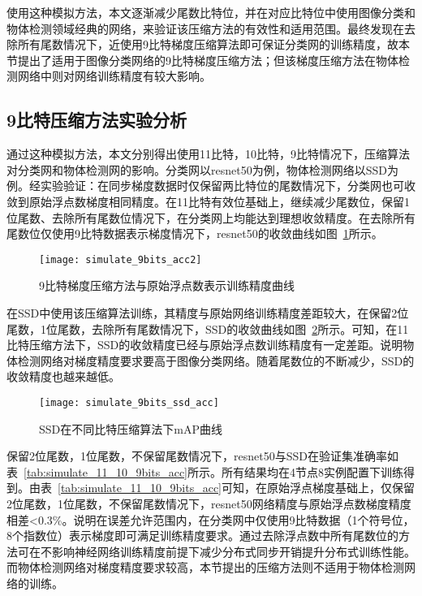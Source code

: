 使用这种模拟方法，本文逐渐减少尾数比特位，并在对应比特位中使用图像分类和物体检测领域经典的网络，来验证该压缩方法的有效性和适用范围。最终发现在去除所有尾数情况下，近使用9比特梯度压缩算法即可保证分类网的训练精度，故本节提出了适用于图像分类网络的9比特梯度压缩方法；但该梯度压缩方法在物体检测网络中则对网络训练精度有较大影响。

\subsection{9比特压缩方法实验分析}
通过这种模拟方法，本文分别得出使用11比特，10比特，9比特情况下，压缩算法对分类网和物体检测网的影响。分类网以resnet50为例，物体检测网络以SSD为例。经实验验证：在同步梯度数据时仅保留两比特位的尾数情况下，分类网也可收敛到原始浮点数梯度相同精度。在11比特有效位基础上，继续减少尾数位，保留1位尾数、去除所有尾数位情况下，在分类网上均能达到理想收敛精度。在去除所有尾数位仅使用9比特数据表示梯度情况下，resnet50的收敛曲线如图~\ref{fig:simulate_9bits_acc}所示。

\begin{figure}[htp]
\centering
\texttt{[image: simulate\_9bits\_acc2]}
\caption{9比特梯度压缩方法与原始浮点数表示训练精度曲线}
\label{fig:simulate_9bits_acc}
\end{figure}

在SSD中使用该压缩算法训练，其精度与原始网络训练精度差距较大，在保留2位尾数，1位尾数，去除所有尾数情况下，SSD的收敛曲线如图~\ref{fig:simulate_9bits_ssd_acc}所示。可知，在11比特压缩方法下，SSD的收敛精度已经与原始浮点数训练精度有一定差距。说明物体检测网络对梯度精度要求要高于图像分类网络。随着尾数位的不断减少，SSD的收敛精度也越来越低。
\begin{figure}[htp]
\centering
\texttt{[image: simulate\_9bits\_ssd\_acc]}
\caption{SSD在不同比特压缩算法下mAP曲线}
\label{fig:simulate_9bits_ssd_acc}
\end{figure}

保留2位尾数，1位尾数，不保留尾数情况下，resnet50与SSD在验证集准确率如表~\ref{tab:simulate_11_10_9bits_acc}所示。所有结果均在4节点8实例配置下训练得到。由表~\ref{tab:simulate_11_10_9bits_acc}可知，在原始浮点梯度基础上，仅保留2位尾数，1位尾数，不保留尾数情况下，resnet50网络精度与原始浮点数梯度精度相差<0.3\%。说明在误差允许范围内，在分类网中仅使用9比特数据（1个符号位，8个指数位）表示梯度即可满足训练精度要求。通过去除浮点数中所有尾数位的方法可在不影响神经网络训练精度前提下减少分布式同步开销提升分布式训练性能。而物体检测网络对梯度精度要求较高，本节提出的压缩方法则不适用于物体检测网络的训练。

